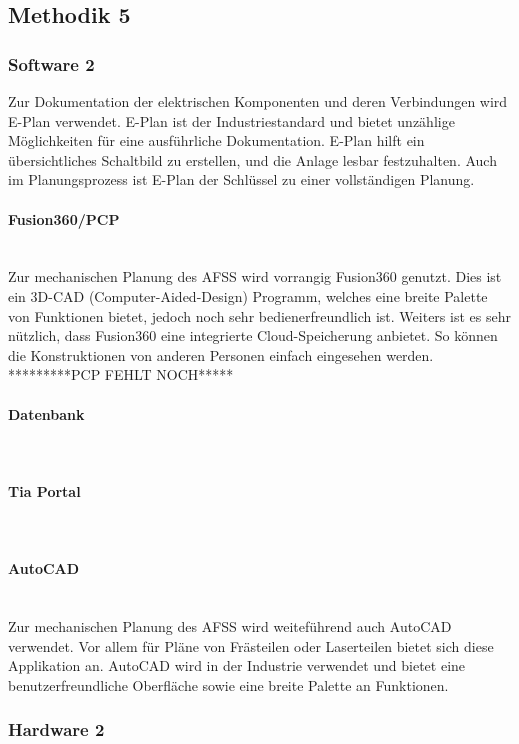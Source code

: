 \subsection{Methodik 5}

\subsubsection{Software 2}

Zur Dokumentation der elektrischen Komponenten und deren Verbindungen wird E-Plan verwendet. E-Plan ist der Industriestandard und bietet unzählige Möglichkeiten für eine ausführliche Dokumentation. E-Plan hilft ein übersichtliches Schaltbild zu erstellen, und die Anlage lesbar festzuhalten. Auch im Planungsprozess ist E-Plan der Schlüssel zu einer vollständigen Planung.
\paragraph{Fusion360/PCP}\mbox{}\\
Zur mechanischen Planung des AFSS wird vorrangig Fusion360 genutzt. Dies ist ein 3D-CAD (Computer-Aided-Design) Programm, welches eine breite Palette von Funktionen bietet, jedoch noch sehr bedienerfreundlich ist. Weiters ist es sehr nützlich, dass Fusion360 eine integrierte Cloud-Speicherung anbietet. So können die Konstruktionen von anderen Personen einfach eingesehen werden. *********PCP FEHLT NOCH*****
\paragraph{Datenbank}\mbox{}\\
\paragraph{Tia Portal}\mbox{}\\
\paragraph{AutoCAD}\mbox{}\\
Zur mechanischen Planung des AFSS wird weiteführend auch AutoCAD verwendet. Vor allem für Pläne von Frästeilen oder Laserteilen bietet sich diese Applikation an. AutoCAD wird in der Industrie verwendet und bietet eine benutzerfreundliche Oberfläche sowie eine breite Palette an Funktionen.
\subsubsection{Hardware 2}

